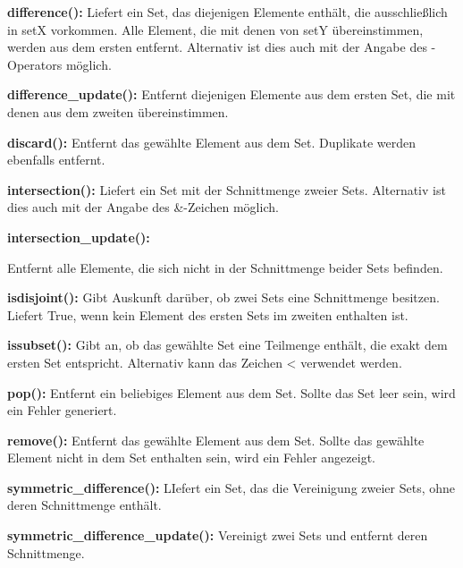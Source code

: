 \textbf{difference():}
Liefert ein Set, das diejenigen Elemente enthält, die ausschließlich in setX vorkommen. Alle Element, die mit denen von setY übereinstimmen, werden aus dem ersten entfernt. Alternativ ist dies auch mit der Angabe des  \glqq{}-\grqq{} Operators möglich.

    
\textbf{difference_update():}
Entfernt diejenigen Elemente aus dem ersten Set, die mit denen aus dem zweiten übereinstimmen.

    
\textbf{discard():}
Entfernt das gewählte Element aus dem Set. Duplikate werden ebenfalls entfernt.


\textbf{intersection():}
Liefert ein Set mit der Schnittmenge zweier Sets. Alternativ ist dies auch mit der Angabe des \glqq{}&\grqq{}-Zeichen möglich.


\textbf{intersection_update():}

Entfernt alle Elemente, die sich nicht in der Schnittmenge beider Sets befinden.
    
\textbf{isdisjoint():}
Gibt Auskunft darüber, ob zwei Sets eine Schnittmenge besitzen. Liefert \glqq{}True\grqq{}, wenn kein Element des ersten Sets im zweiten enthalten ist.

    
\textbf{issubset():}
Gibt an, ob das gewählte Set eine Teilmenge enthält, die exakt dem ersten Set entspricht. Alternativ kann das Zeichen \glqq{}<\grqq{} verwendet werden.

    
\textbf{pop():}
Entfernt ein beliebiges Element aus dem Set. Sollte das Set leer sein, wird ein Fehler generiert.

    
\textbf{remove():}
Entfernt das gewählte Element aus dem Set. Sollte das gewählte Element nicht in dem Set enthalten sein, wird ein Fehler angezeigt.

    
\textbf{symmetric_difference():}
LIefert ein Set, das die Vereinigung zweier Sets, ohne deren Schnittmenge enthält.

    
\textbf{symmetric_difference_update():}
Vereinigt zwei Sets und entfernt deren Schnittmenge.

    
